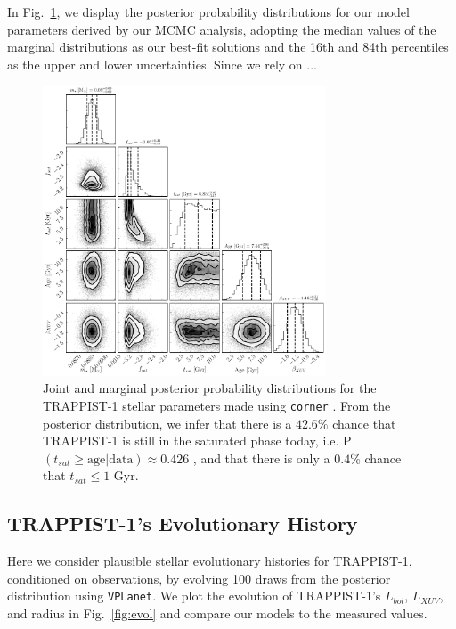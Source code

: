\documentclass[twocolumn]{aastex62}
\newcommand{\vplanet}[0]{\texttt{VPLanet}\xspace}
\begin{document}
In Fig.~\ref{fig:corner}, we display the posterior probability distributions for our model parameters derived by our MCMC analysis, adopting the median values of the marginal distributions as our best-fit solutions and the 16th and 84th percentiles as the upper and lower uncertainties. Since we rely on ... 

\begin{figure}[t]
\centering
	\includegraphics[width=0.75\textwidth]{../Analysis/Corner/trappist1Corner.pdf}
   \caption{Joint and marginal posterior probability distributions for the TRAPPIST-1 stellar parameters made using \texttt{corner} \citep{ForemanMackey2016}. From the posterior distribution, we infer that there is a $42.6\%$ chance that TRAPPIST-1 is still in the saturated phase today, i.e. P$(t_{sat} \geq \mathrm{ age } | \mathrm{data}) \approx 0.426$ , and that there is only a $0.4\%$ chance that $t_{sat} \leq 1$ Gyr.}%
    \label{fig:corner}%
\end{figure}

\subsection{TRAPPIST-1's Evolutionary History}

Here we consider plausible stellar evolutionary histories for TRAPPIST-1, conditioned on observations, by evolving 100 draws from the posterior distribution using \vplanet. We plot the evolution of TRAPPIST-1's $L_{bol}$, $L_{XUV}$, and radius in Fig.~\ref{fig:evol} and compare our models to the measured values. 
\end{document}
